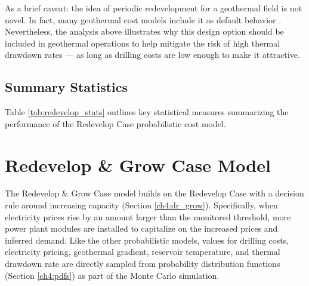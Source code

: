 As a brief caveat: the idea of periodic redevelopment for a geothermal field is not novel. In fact, many geothermal cost models include it as default behavior \citep[e.g.,\ ][]{entingh_volume_2006, blair_system_2018}. Nevertheless, the analysis above illustrates why this design option should be included in geothermal operations to help mitigate the risk of high thermal drawdown rates --- as long as drilling costs are low enough to make it attractive. 

\subsection{Summary Statistics}\label{ch6:redevelop_stats}

Table \ref{tab:redevelop_stats} outlines key statistical measures summarizing the performance of the Redevelop Case probabilistic cost model.

\begin{table}[H]
\centering
{}
\caption[Probabilistic Redevelop Case statistics]{Redevelop case probabilistic model statistics for 2000 model realizations. NPV$_s$ refers to the static model NPV reported in Section \ref{ch6:static_stats}.}
\label{tab:redevelop_stats}
\end{table}

\section{Redevelop \& Grow Case Model}\label{ch6:grow_case}

The Redevelop \& Grow Case model builds on the Redevelop Case with a decision rule around increasing capacity (Section \ref{ch4:dr_grow}). Specifically, when electricity prices rise by an amount larger than the monitored threshold, more power plant modules are installed to capitalize on the increased prices and inferred demand. Like the other probabilistic models, values for drilling costs, electricity pricing, geothermal gradient, reservoir temperature, and thermal drawdown rate are directly sampled from probability distribution functions (Section \ref{ch4:pdfs}) as part of the Monte Carlo simulation.

